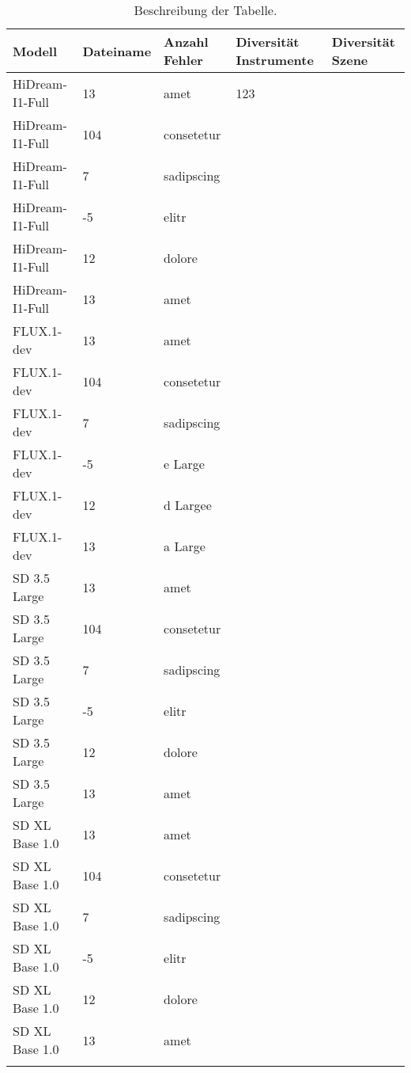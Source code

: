 \begin{table}[htbp]
    \centering
    \begin{tabular}{lllll}
    \toprule
    Modell & Dateiname & Anzahl Fehler & Diversität Instrumente & Diversität Szene \\
    \midrule
    HiDream-I1-Full &  13 & amet  & 123 &  \\ \addlinespace
    HiDream-I1-Full & 104 & consetetur \\ \addlinespace
    HiDream-I1-Full &   7 & sadipscing \\ \addlinespace
    HiDream-I1-Full &  -5 & elitr \\ \addlinespace
    HiDream-I1-Full &  12 & dolore \\ \addlinespace
    HiDream-I1-Full &  13 & amet \\ \addlinespace
    FLUX.1-dev &  13 & amet \\ \addlinespace
    FLUX.1-dev & 104 & consetetur \\ \addlinespace
    FLUX.1-dev &   7 & sadipscing \\ \addlinespace
    FLUX.1-dev &  -5 & e Large \\ \addlinespace
    FLUX.1-dev &  12 & d Largee \\ \addlinespace
    FLUX.1-dev &  13 & a Large\\ \addlinespace
    SD 3.5 Large &  13 & amet \\ \addlinespace
    SD 3.5 Large & 104 & consetetur \\ \addlinespace
    SD 3.5 Large &   7 & sadipscing \\ \addlinespace
    SD 3.5 Large &  -5 & elitr \\ \addlinespace
    SD 3.5 Large &  12 & dolore \\ \addlinespace
    SD 3.5 Large &  13 & amet \\ \addlinespace
    SD XL Base 1.0 &  13 & amet \\ \addlinespace
    SD XL Base 1.0 & 104 & consetetur \\ \addlinespace
    SD XL Base 1.0 &   7 & sadipscing \\ \addlinespace
    SD XL Base 1.0 &  -5 & elitr \\ \addlinespace
    SD XL Base 1.0 &  12 & dolore \\ \addlinespace
    SD XL Base 1.0 &  13 & amet \\ \addlinespace
    \bottomrule
    \end{tabular}
    \caption{Beschreibung der Tabelle.}
    \label{beispieltabelle}
\end{table}

